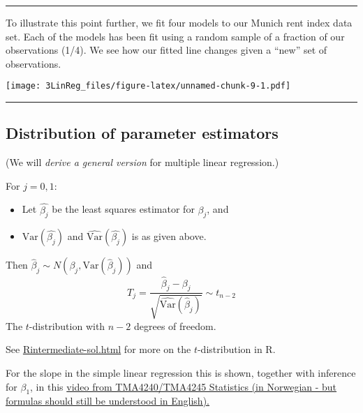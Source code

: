 \documentclass[]{article}
\providecommand{\tightlist}{%
  \setlength{\itemsep}{0pt}\setlength{\parskip}{0pt}}
\begin{document}
\normalsize

\begin{center}\rule{0.5\linewidth}{\linethickness}\end{center}

To illustrate this point further, we fit four models to our Munich rent
index data set. Each of the models has been fit using a random sample of
a fraction of our observations (1/4). We see how our fitted line changes
given a ``new'' set of observations.

\texttt{[image: 3LinReg\_files/figure-latex/unnamed-chunk-9-1.pdf]}

\begin{center}\rule{0.5\linewidth}{\linethickness}\end{center}

\hypertarget{distribution-of-parameter-estimators}{%
\subsection{Distribution of parameter
estimators}\label{distribution-of-parameter-estimators}}

(We will \emph{derive a general version} for multiple linear
regression.)

For \(j=0,1\):

\begin{itemize}
\tightlist
\item
  Let \(\hat{\beta_j}\) be the least squares estimator for \(\beta_j\),
  and
\item
  \(\text{Var}(\hat{\beta_j})\) and
  \(\widehat{\text{Var}}(\hat{\beta_j})\) is as given above.
\end{itemize}

Then \(\hat{\beta}_j \sim N(\beta_j,\text{Var}(\hat{\beta}_j))\) and
\[T_j =\frac{\hat{\beta}_j-\beta_j}{\sqrt{\widehat{\text{Var}}(\hat{\beta}_j)}} \sim t_{n-2}\]
The \(t\)-distribution with \(n-2\) degrees of freedom.

See
\href{https://wwww.math.ntnu.no/emner/TMA4268/2018v/1Intro/Rintermediate-sol.html}{Rintermediate-sol.html}
for more on the \(t\)-distribution in R.

For the slope in the simple linear regression this is shown, together
with inference for \(\beta_1\), in this
\href{https://mediasite.ntnu.no/Mediasite/Play/2e9a209c58874e75bd47e3c5e0b7b4e81d?catalog=0fce6173-7a98-4db7-84b7-50cba3a3a341}{video
from TMA4240/TMA4245 Statistics (in Norwegian - but formulas should
still be understood in English).}
\end{document}
